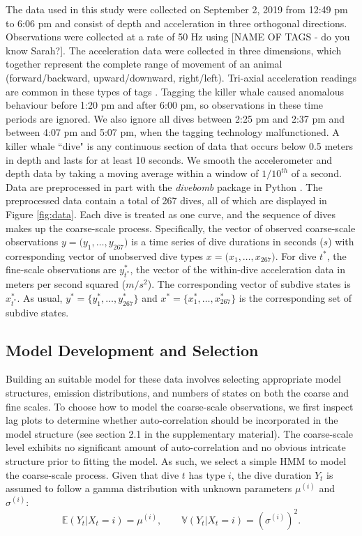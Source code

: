 The data used in this study were collected on September 2, 2019 from 12:49 pm to 6:06 pm and consist of depth and acceleration in three orthogonal directions. Observations were collected at a rate of 50 Hz using
[NAME OF TAGS - do you know Sarah?]. The acceleration data were collected in three dimensions, which together represent the complete range of movement of an animal (forward/backward, upward/downward, right/left). Tri-axial acceleration readings are common in these types of tags \citep{Cade:2017,Fehlmann:2017,Wright:2017}. Tagging the killer whale caused anomalous behaviour before 1:20 pm and after 6:00 pm, so observations in these time periods are ignored. We also ignore all dives between 2:25 pm and 2:37 pm and between 4:07 pm and 5:07 pm, when the tagging technology malfunctioned. A killer whale ``dive" is any continuous section of data that occurs below 0.5 meters in depth and lasts for at least 10 seconds. We smooth the accelerometer and depth data by taking a moving average within a window of $1/10^{th}$ of a second. Data are preprocessed in part with the \textit{divebomb} package in Python \citep{Nunes:2018}. The preprocessed data contain a total of 267 dives, all of which are displayed in Figure \ref{fig:data}. Each dive is treated as one curve, and the sequence of dives makes up the coarse-scale process. Specifically, the vector of observed coarse-scale observations $y = \Big(y_1,\ldots,y_{267}\Big)$ is a time series of dive durations in seconds ($s$) with corresponding vector of unobserved dive types $x = \Big(x_1,\ldots,x_{267}\Big)$. For dive $t^*$, the fine-scale observations are $y^*_{t^*}$, the vector of the within-dive acceleration data in meters per second squared ($m/s^2$).  The corresponding vector of subdive states is $x_{t^*}^*$.  As usual, $y^* = \Big\{y^*_1,\ldots,y^*_{267}\Big\}$ and $x^* = \Big\{x^*_1,\ldots,x^*_{267}\Big\}$ is the corresponding set of subdive states.

\subsection{Model Development and Selection}

Building an suitable model for these data involves selecting appropriate model structures, emission distributions, and numbers of states on both the coarse and fine scales. To choose how to model the coarse-scale observations, we first inspect lag plots to determine whether auto-correlation should be incorporated in the model structure (see section 2.1 in the supplementary material). The coarse-scale level exhibits no significant amount of auto-correlation and no obvious intricate structure prior to fitting the model. As such, we select a simple HMM to model the coarse-scale process.
Given that dive $t$ has type $i$, the dive duration $Y_t$ is assumed to follow a gamma distribution with unknown parameters $\mu^{(i)}$ and $\sigma^{(i)}$:
%
$$\mathbb{E}(Y_t|X_t = i) = \mu^{(i)}, \qquad \mathbb{V}(Y_t|X_t = i) = \left(\sigma^{(i)}\right)^2.$$

